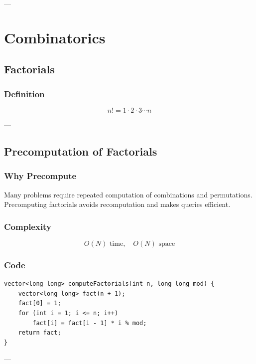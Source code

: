 \documentclass[11pt]{article}
\begin{document}
---

\section{Combinatorics}

\subsection{Factorials}

\subsubsection{Definition}
\[
n! = 1 \cdot 2 \cdot 3 \cdots n
\]

---

\subsection{Precomputation of Factorials}

\subsubsection{Why Precompute}
Many problems require repeated computation of combinations and permutations.
Precomputing factorials avoids recomputation and makes queries efficient.

\subsubsection{Complexity}
\[
O(N) \text{ time}, \quad O(N) \text{ space}
\]

\subsubsection{Code}
\begin{lstlisting}
vector<long long> computeFactorials(int n, long long mod) {
    vector<long long> fact(n + 1);
    fact[0] = 1;
    for (int i = 1; i <= n; i++)
        fact[i] = fact[i - 1] * i % mod;
    return fact;
}
\end{lstlisting}

---
\end{document}
